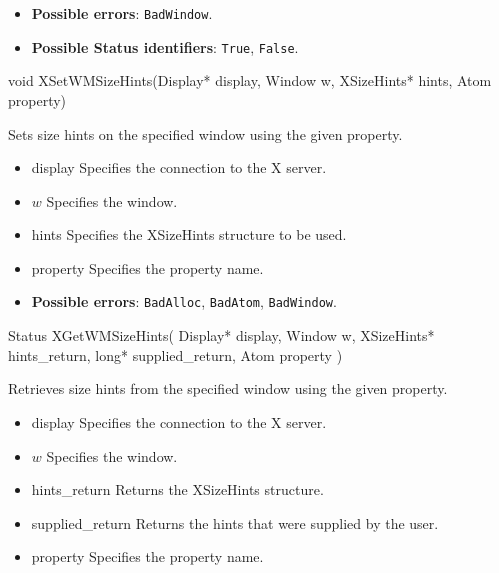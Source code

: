 \documentclass{report}
\begin{document}
\begin{itemize}
            \begin{itemize}
                \item \textbf{Possible errors}: \texttt{BadWindow}.
                \item \textbf{Possible Status identifiers}: \texttt{True}, \texttt{False}.
            \end{itemize}

            \begin{cppcode}
            void XSetWMSizeHints(Display* display, Window w, XSizeHints* hints, Atom property)
            \end{cppcode}
            \bigbreak \noindent
            Sets size hints on the specified window using the given property.

            \begin{itemize}
                \item display Specifies the connection to the X server.
                \item $w$ Specifies the window.
                \item hints Specifies the XSizeHints structure to be used.
                \item property Specifies the property name.
            \end{itemize}

            \begin{itemize}
                \item \textbf{Possible errors}: \texttt{BadAlloc}, \texttt{BadAtom}, \texttt{BadWindow}.
            \end{itemize}

            \begin{cppcode}
            Status XGetWMSizeHints(
                Display* display,
                Window w,
                XSizeHints* hints_return,
                long* supplied_return,
                Atom property
            )
            \end{cppcode}
            \bigbreak \noindent
            Retrieves size hints from the specified window using the given property.

            \begin{itemize}
                \item display Specifies the connection to the X server.
                \item $w$ Specifies the window.
                \item hints\_return Returns the XSizeHints structure.
                \item supplied\_return Returns the hints that were supplied by the user.
                \item property Specifies the property name.
            \end{itemize}


\end{itemize}
\end{document}

